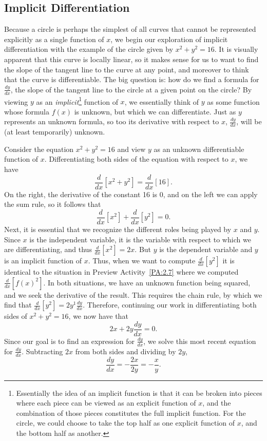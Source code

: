 

\subsection*{Implicit Differentiation}

Because a circle is perhaps the simplest of all curves that cannot be represented explicitly as a single function of $x$, we begin our exploration of implicit differentiation with the example of the circle given by $x^2 + y^2 = 16.$  It is visually apparent that this curve is locally linear, so it makes sense for us to want to find the slope of the tangent line to the curve at any point, and moreover to think that the curve is differentiable.  The big question is:  how do we find a formula for $\frac{dy}{dx}$, the slope of the tangent line to the circle at a given point on the circle?  By viewing $y$ as an \emph{implicit}\footnote{Essentially the idea of an implicit function is that it can be broken into pieces where each piece can be viewed as an explicit function of $x$, and the combination of those pieces constitutes the full implicit function.  For the circle, we could choose to take the top half as one explicit function of $x$, and the bottom half as another.}  function of $x$, we essentially think of $y$ as some function whose formula $f(x)$ is unknown, but which we can differentiate.  Just as $y$ represents an unknown formula, so too its derivative with respect to $x$, $\frac{dy}{dx}$, will be (at least temporarily) unknown.

Consider the equation $x^2 + y^2 = 16$ and view $y$ as an unknown differentiable function of $x$.  Differentiating both sides of the equation with respect to $x$, we have 
$$\frac{d}{dx} \left[ x^2 + y^2 \right] = \frac{d}{dx} \left[ 16 \right].$$
On the right, the derivative of the constant 16 is 0, and on the left we can apply the sum rule, so it follows that
$$\frac{d}{dx} \left[ x^2 \right]  + \frac{d}{dx} \left[ y^2 \right] = 0.$$
Next, it is essential that we recognize the different roles being played by $x$ and $y$.  Since $x$ is the independent variable, it is the variable with respect to which we are differentiating, and thus $\frac{d}{dx} \left[x^2\right] = 2x.$  But $y$ is the dependent variable and $y$ is an implicit function of $x$.  Thus, when we want to compute $\frac{d}{dx}[y^2]$ it is identical to the situation in Preview Activity~\ref{PA:2.7} where we computed $\frac{d}{dx}[f(x)^2]$.  In both situations, we have an unknown function being squared, and we seek the derivative of the result.  This requires the chain rule, by which we find that $\frac{d}{dx}[y^2] = 2y^1 \frac{dy}{dx}.$  Therefore, continuing our work in differentiating both sides of $x^2 + y^2 = 16$, we now have that
$$2x + 2y \frac{dy}{dx} = 0.$$
Since our goal is to find an expression for $\frac{dy}{dx}$, we solve this most recent equation for $\frac{dy}{dx}$.  Subtracting $2x$ from both sides and dividing by $2y$,
$$\frac{dy}{dx} = -\frac{2x}{2y} = -\frac{x}{y}.$$

